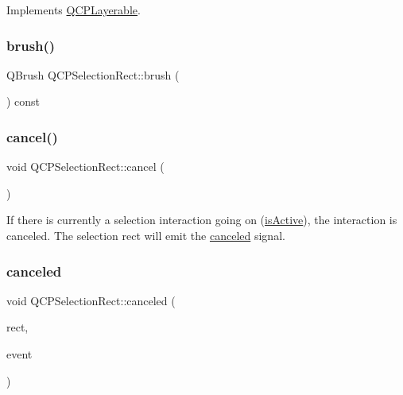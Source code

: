 Implements \hyperlink{class_q_c_p_layerable_afdf83ddc6a265cbf4c89fe99d3d93473}{Q\+C\+P\+Layerable}.

\mbox{\label{class_q_c_p_selection_rect_a9669c77c5796dea9dc089a088d50ebfb}} 
\subsubsection{\texorpdfstring{brush()}{brush()}}
{\footnotesize\ttfamily Q\+Brush Q\+C\+P\+Selection\+Rect\+::brush (\begin{DoxyParamCaption}{ }\end{DoxyParamCaption}) const\hspace{0.3cm}{\ttfamily [inline]}}

\mbox{\label{class_q_c_p_selection_rect_af67bc58f4f5ce9a4dc420b9c42de235a}} 
\subsubsection{\texorpdfstring{cancel()}{cancel()}}
{\footnotesize\ttfamily void Q\+C\+P\+Selection\+Rect\+::cancel (\begin{DoxyParamCaption}{ }\end{DoxyParamCaption})}

If there is currently a selection interaction going on (\hyperlink{class_q_c_p_selection_rect_ad27c1569c6ea8fa48e24b81e2a302df3}{is\+Active}), the interaction is canceled. The selection rect will emit the \hyperlink{class_q_c_p_selection_rect_aeb82009393c90130102dccf36477b906}{canceled} signal. \mbox{\label{class_q_c_p_selection_rect_aeb82009393c90130102dccf36477b906}} 
\subsubsection{\texorpdfstring{canceled}{canceled}}
{\footnotesize\ttfamily void Q\+C\+P\+Selection\+Rect\+::canceled (\begin{DoxyParamCaption}\item[{const Q\+Rect \&}]{rect,  }\item[{Q\+Input\+Event $\ast$}]{event }\end{DoxyParamCaption})\hspace{0.3cm}{\ttfamily [signal]}}

